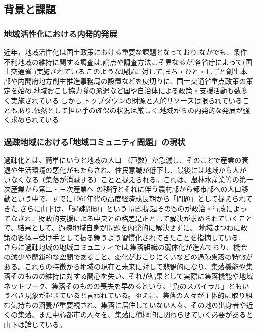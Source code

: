 \documentclass[a4paper]{jsarticle}
\begin{document}
\subsection{背景と課題}
\subsubsection{地域活性化における内発的発展}
近年，地域活性化は国土政策における重要な課題となっており,なかでも、条件不利地域の維持に関する調査は,論点や調査方法こそ異なるが,各省庁によって(国土交通省\cite{1},)実施されている.このような現状に対して,まち・ひと・しごと創生本部や内閣府地方創生推進事務局の設置などを皮切りに、国土交通省重点政策\cite{2}の策定を始め,地域おこし協力隊の派遣など国や自治体による政策・支援活動も数多く実施されている.しかし,トップダウンの財源と人的リソースは限られていることもあり,依然として担い手の確保の状況は厳しく,地域からの内発的な発展が強く求められている.
\subsubsection{過疎地域における｢地域コミュニティ問題」の現状}
過疎化とは、簡単にいうと地域の人口 （戸数）が急減し、そのことで産業の衰 退や生活環境の悪化がもたらされ、住民意識が低下し、最後には地域から人がいなくなる（集落が消滅する）ことと捉えられる。\cite{3}これは、農林水産業等の第一次産業から第二・三次産業へ の移行とそれに伴う農村部から都市部への人口移動という中で、すでに1960年代の高度経済成長期から「問題」として捉えられてきた.\cite{4}さらに山下は、「過疎問題」という 問題提起そのものが政治・行政によってなされ、財政的支援による中央との格差是正として解決が求められていくことで、結果として、過疎地域自身が問題を内発的に解決せずに、 地域はつねに政策の客体＝受け手として振る舞うよう習慣化されてきたことを指摘している.\cite{5}
　さらに過疎地域の地域コミュニティでは,集落組織の弱体化が進んでおり、機会の減少や閉鎖的な空間であること、変化がおこりにくいなどの過疎集落の特徴がある。これらの特徴から地域の現在と未来に対して悲観的になり、集落機能や集落そのものの維持に対する関心を失い、それが結果として実際に集落機能や地域ネットワーク、集落そのものの喪失を早めるという、「負のスパイラル」ともいうべき現象が起きていると言われている。\cite{6}ゆえに、集落の人々が主体的に取り組む気持ちの涵養が重要視され、集落に居住していない人々、その地の出身者や近くの集落、また中心都市の人々を、集落に積極的に関わらせていく必要があると山下は論じている。\cite{7}
\end{document}
